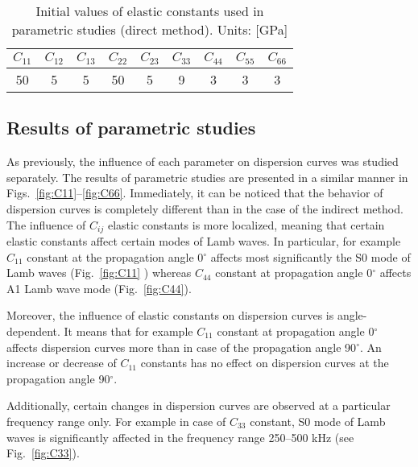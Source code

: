 \documentclass[]{spie}  %
\begin{document}
\begin{table}[h!]
	\renewcommand{\arraystretch}{1.3}
	\caption{Initial values of elastic constants used in parametric studies (direct method). 
	Units: [GPa]}
		\label{tab:Ctensor_initial}
	\begin{center}
		\begin{tabular}{ccccccccc} 
			\toprule
			\(C_{11}\) & \(C_{12}\) & \(C_{13}\)  & \(C_{22}\) & \(C_{23}\) & \(C_{33}\) & 
			\(C_{44}\)  & \(C_{55}\) & \(C_{66}\) \\
			\midrule
			50 &5& 5&  50 & 5 & 9 & 3 & 3 & 3\\
			\bottomrule 
		\end{tabular} 
	\end{center}
\end{table}

\subsection{Results of parametric studies}
As previously, the influence of each parameter on dispersion curves was studied separately. 
The results of parametric studies are presented in a similar manner in Figs.~\ref{fig:C11}--\ref{fig:C66}.
Immediately, it can be noticed that the behavior of dispersion curves is completely different than in the case of the indirect method. 
The influence of \(C_{ij}\) elastic constants is more localized, meaning that certain elastic constants affect certain modes of Lamb waves. 
In particular, for example \(C_{11}\) constant at the propagation angle 0\(^{\circ}\) affects most significantly the S0 mode of Lamb waves (Fig.~\ref{fig:C11} ) whereas \(C_{44}\) constant at propagation angle 0\(^{\circ}\) affects A1 Lamb wave mode (Fig.~\ref{fig:C44}).

Moreover, the influence of elastic constants on dispersion curves is angle-dependent. 
It means that  for example \(C_{11}\) constant at propagation angle 0\(^{\circ}\) affects dispersion curves more than in case of the propagation angle 90\(^{\circ}\). 
An increase or decrease of  \(C_{11}\) constants has no effect on dispersion curves at  the propagation angle 90\(^{\circ}\). 

Additionally, certain changes in dispersion curves are observed at a particular frequency range only. 
For example in case of  \(C_{33}\) constant, S0 mode of Lamb waves is significantly affected in the frequency range 250--500 kHz (see Fig.~\ref{fig:C33}).
\end{document}
